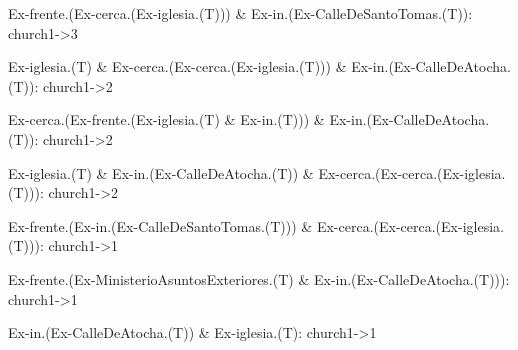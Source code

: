 Ex-frente.(Ex-cerca.(Ex-iglesia.(T))) \& Ex-in.(Ex-CalleDeSantoTomas.(T)): church1->3

Ex-iglesia.(T) \& Ex-cerca.(Ex-cerca.(Ex-iglesia.(T))) \& Ex-in.(Ex-CalleDeAtocha.(T)): church1->2

Ex-cerca.(Ex-frente.(Ex-iglesia.(T) \& Ex-in.(T))) \& Ex-in.(Ex-CalleDeAtocha.(T)): church1->2

Ex-iglesia.(T) \& Ex-in.(Ex-CalleDeAtocha.(T)) \& Ex-cerca.(Ex-cerca.(Ex-iglesia.(T))): church1->2

Ex-frente.(Ex-in.(Ex-CalleDeSantoTomas.(T))) \& Ex-cerca.(Ex-cerca.(Ex-iglesia.(T))): church1->1

Ex-frente.(Ex-MinisterioAsuntosExteriores.(T) \& Ex-in.(Ex-CalleDeAtocha.(T))): church1->1

Ex-in.(Ex-CalleDeAtocha.(T)) \& Ex-iglesia.(T): church1->1
